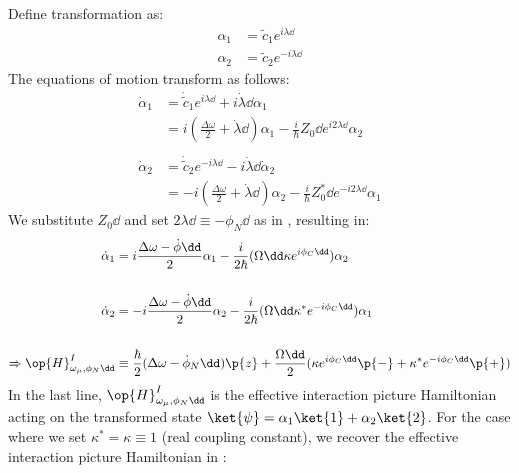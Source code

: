 Define transformation as:
\begin{align}
\alpha_1 &= \tilde{c}_1e^{i\lambda\dd} \\
\alpha_2 &= \tilde{c}_2e^{-i\lambda\dd}
\end{align}
The equations of motion transform as follows:
\begin{align}
\dot{\alpha}_1 & = \dot{\tilde{c}}_1 e^{i \lambda\dd} + i \dot{\lambda}\dd \alpha_1 \\
& =  i(\frac{\Delta \omega}{2} + \dot{\lambda}\dd)\alpha_1 - \frac{i}{\hbar}Z_0\dd e^{i2\lambda\dd}\alpha_2\\
& \nonumber \\
\dot{\alpha}_2 & = \dot{\tilde{c}}_2 e^{-i \lambda\dd} - i \dot{\lambda}\dd\dot{\alpha}_2 \\
& =  -i(\frac{\Delta \omega}{2} + \dot{\lambda}\dd)\alpha_2- \frac{i}{\hbar}Z_0^*\dd e^{-i2\lambda\dd}\alpha_1
\end{align}
We substitute $Z_0\dd$ and set $2\lambda\dd \equiv -\phi_N\dd$  as in \cite{soare}, resulting in:
\begin{align}
\dot{\alpha}_1 & =  i\frac{\Delta \omega - \dot{\phi}\dd}{2}\alpha_1 - \frac{i}{2\hbar}(\Omega\dd \kappa e^{i\phi_C\dd}) \alpha_2\\
& \nonumber \\
\dot{\alpha}_2 & =  -i\frac{\Delta \omega - \dot{\phi}\dd}{2}\alpha_2- \frac{i}{2\hbar}(\Omega\dd \kappa^* e^{-i\phi_C\dd})\alpha_1\\
&\nonumber \\
\Rightarrow \op{H}^{I}_{\omega_\mu,\phi_N\dd} &\equiv \frac{\hbar}{2}(\Delta\omega - \dot{\phi}_N\dd)\p{z} + \frac{\Omega\dd}{2} (\kappa e^{i\phi_C\dd}\p{-} + \kappa^* e^{-i\phi_C\dd}\p{+}) \label{eqn:Hi}
\end{align}
In the last line, $\op{H}^{I}_{\omega_\mu,\phi_N\dd}$ is the effective interaction picture Hamiltonian acting on the transformed state $\ket{\psi} = \alpha_1\ket{1} + \alpha_2\ket{2}$. For the case where we set $\kappa^* = \kappa \equiv 1$ (real coupling constant), we recover the effective interaction picture Hamiltonian in \cite{soare}:

